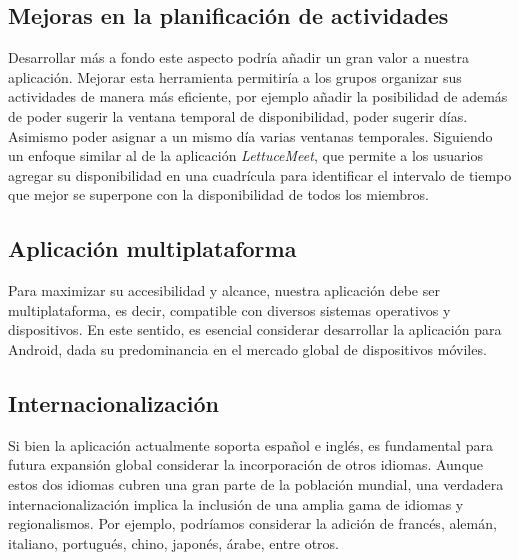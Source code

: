         \subsection{Mejoras en la planificación de actividades}
            Desarrollar más a fondo este aspecto podría añadir un gran valor a nuestra aplicación. Mejorar esta herramienta permitiría a los grupos organizar sus actividades de manera más eficiente, por ejemplo añadir la posibilidad de además de poder sugerir la ventana temporal de disponibilidad, poder sugerir días. Asimismo poder asignar a un mismo día varias ventanas temporales. Siguiendo un enfoque similar al de la aplicación \textit{LettuceMeet}\cite{REF7}, que permite a los usuarios agregar su disponibilidad en una cuadrícula para identificar el intervalo de tiempo que mejor se superpone con la disponibilidad de todos los miembros.

        \subsection{Aplicación multiplataforma}
            Para maximizar su accesibilidad y alcance, nuestra aplicación debe ser multiplataforma, es decir, compatible con diversos sistemas operativos y dispositivos. En este sentido, es esencial considerar desarrollar la aplicación para Android, dada su predominancia en el mercado global de dispositivos móviles.

        \subsection{Internacionalización}
            Si bien la aplicación actualmente soporta español e inglés, es fundamental para futura expansión global considerar la incorporación de otros idiomas. Aunque estos dos idiomas cubren una gran parte de la población mundial, una verdadera internacionalización implica la inclusión de una amplia gama de idiomas y regionalismos. Por ejemplo, podríamos considerar la adición de francés, alemán, italiano, portugués, chino, japonés, árabe, entre otros.
